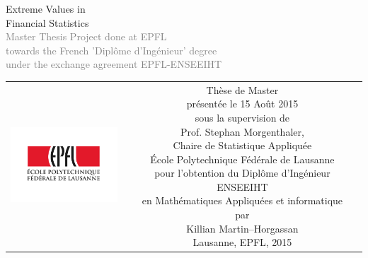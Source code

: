 \begin{titlepage}
\begin{center}
\sffamily


\null\vspace{2cm}
{\huge Extreme Values in \\[12pt] Financial Statistics} \\[24pt] 
\textcolor{gray}{\small{Master Thesis Project done at EPFL \\ towards the French 'Dipl\^{o}me d'Ingénieur' degree \\ under the exchange agreement EPFL-ENSEEIHT}}
    
\vfill

\begin{tabular} {cc}
\parbox{0.3\textwidth}{\includegraphics[width=4cm]{images/epfl}}
&
\parbox{0.7\textwidth}{%
	Thèse de Master\\
	présentée le 15 Ao\^{u}t 2015\\
	sous la supervision de\\[4pt]
	Prof. Stephan Morgenthaler, \\
	Chaire de Statistique Appliquée\\[4pt]
%
	École Polytechnique Fédérale de Lausanne\\[6pt]
	pour l'obtention du Dipl\^{o}me d'Ingénieur ENSEEIHT\\
	en Mathématiques Appliquées et informatique \\
	par\\ [4pt]
	\null \hspace{3em} Killian Martin--Horgassan\\[9pt]
%
\small
%
%
Lausanne, EPFL, 2015}
\end{tabular}
\end{center}
\vspace{2cm}
\end{titlepage}



